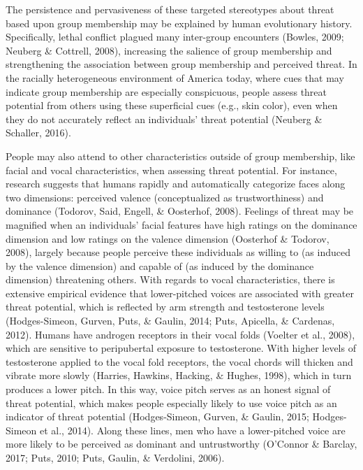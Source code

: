 \documentclass[
  english,
  man, noextraspace,floatsintext]{apa6}
\begin{document}
The persistence and pervasiveness of these targeted stereotypes about threat based upon group membership may be explained by human evolutionary history. Specifically, lethal conflict plagued many inter-group encounters (Bowles, 2009; Neuberg \& Cottrell, 2008), increasing the salience of group membership and strengthening the association between group membership and perceived threat. In the racially heterogeneous environment of America today, where cues that may indicate group membership are especially conspicuous, people assess threat potential from others using these superficial cues (e.g., skin color), even when they do not accurately reflect an individuals' threat potential (Neuberg \& Schaller, 2016).

People may also attend to other characteristics outside of group membership, like facial and vocal characteristics, when assessing threat potential. For instance, research suggests that humans rapidly and automatically categorize faces along two dimensions: perceived valence (conceptualized as trustworthiness) and dominance (Todorov, Said, Engell, \& Oosterhof, 2008). Feelings of threat may be magnified when an individuals' facial features have high ratings on the dominance dimension and low ratings on the valence dimension (Oosterhof \& Todorov, 2008), largely because people perceive these individuals as willing to (as induced by the valence dimension) and capable of (as induced by the dominance dimension) threatening others. With regards to vocal characteristics, there is extensive empirical evidence that lower-pitched voices are associated with greater threat potential, which is reflected by arm strength and testosterone levels (Hodges-Simeon, Gurven, Puts, \& Gaulin, 2014; Puts, Apicella, \& Cardenas, 2012). Humans have androgen receptors in their vocal folds (Voelter et al., 2008), which are sensitive to peripubertal exposure to testosterone. With higher levels of testosterone applied to the vocal fold receptors, the vocal chords will thicken and vibrate more slowly (Harries, Hawkins, Hacking, \& Hughes, 1998), which in turn produces a lower pitch. In this way, voice pitch serves as an honest signal of threat potential, which makes people especially likely to use voice pitch as an indicator of threat potential (Hodges-Simeon, Gurven, \& Gaulin, 2015; Hodges-Simeon et al., 2014). Along these lines, men who have a lower-pitched voice are more likely to be perceived as dominant and untrustworthy (O'Connor \& Barclay, 2017; Puts, 2010; Puts, Gaulin, \& Verdolini, 2006).
\end{document}
